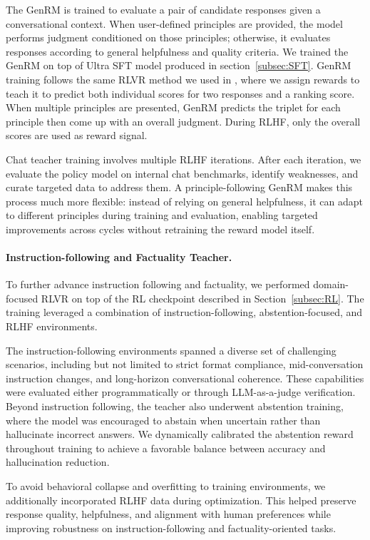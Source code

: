 The GenRM is trained to evaluate a pair of candidate responses given a conversational context. When user-defined principles are provided, the model performs judgment conditioned on those principles; otherwise, it evaluates responses according to general helpfulness and quality criteria.
We trained the GenRM on top of Ultra SFT model produced in section~\ref{subsec:SFT}. GenRM training follows the same RLVR method we used in \cite{nvidia2026nemotron3superopen}, where we assign rewards to teach it to predict both individual scores for two responses and a ranking score. When multiple principles are presented, GenRM predicts the triplet for each principle then come up with an overall judgment. During RLHF, only the overall scores are used as reward signal.

Chat teacher training involves multiple RLHF iterations. After each iteration, we evaluate the policy model on internal chat benchmarks, identify weaknesses, and curate targeted data to address them. A principle-following GenRM makes this process much more flexible: instead of relying on general helpfulness, it can adapt to different principles during training and evaluation, enabling targeted improvements across cycles without retraining the reward model itself.



\paragraph{Instruction-following and Factuality Teacher.}
To further advance instruction following and factuality, we performed domain-focused RLVR on top of the RL checkpoint described in Section~\ref{subsec:RL}. The training leveraged a combination of instruction-following, abstention-focused, and RLHF environments.

The instruction-following environments spanned a diverse set of challenging scenarios, including but not limited to strict format compliance, mid-conversation instruction changes, and long-horizon conversational coherence. These capabilities were evaluated either programmatically or through LLM-as-a-judge verification. Beyond instruction following, the teacher also underwent abstention training, where the model was encouraged to abstain when uncertain rather than hallucinate incorrect answers. We dynamically calibrated the abstention reward throughout training to achieve a favorable balance between accuracy and hallucination reduction.

To avoid behavioral collapse and overfitting to training environments, we additionally incorporated RLHF data during optimization. This helped preserve response quality, helpfulness, and alignment with human preferences while improving robustness on instruction-following and factuality-oriented tasks.

